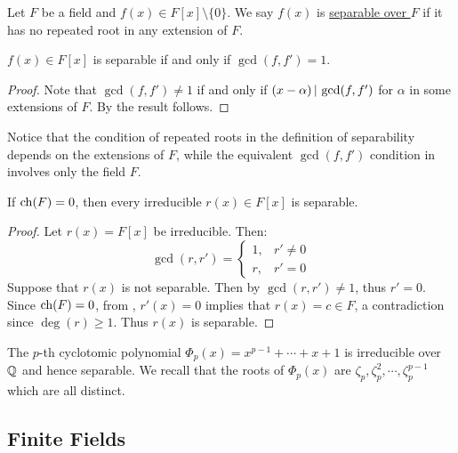 \documentclass[11pt]{article}
\begin{document}
\begin{definition}
    Let $F$ be a field and $f(x)\in F[x]\setminus\{0\}$. We say $f(x)$ is \ul{separable over $F$} if it has no repeated root in any extension of $F$.
\end{definition}

\begin{corollary}
    $f(x)\in F[x]$ is separable if and only if $\gcd(f,f')=1$.
\end{corollary}

\begin{proof}
    Note that $\gcd(f,f')\neq1$ if and only if $(x-\alpha)\,|\, \gcd(f,f')$ for $\alpha$ in some extensions of $F$. By  the result follows.
\end{proof}

\begin{remark}
    Notice that the condition of repeated roots in the definition of separability depends on the extensions of $F$, while the equivalent $\gcd(f,f')$ condition in  involves only the field $F$.
\end{remark}

\begin{corollary}
    If $\operatorname{ch}(F)=0$, then every irreducible $r(x)\in F[x]$ is separable.
\end{corollary}

\begin{proof}
    Let $r(x)=F[x]$ be irreducible. Then:
    \[\gcd(r,r')=\begin{cases}1, & r'\neq0 \\ r, & r'=0\end{cases}\]
    Suppose that $r(x)$ is not separable. Then by  $\gcd(r,r')\neq1$, thus $r'=0$. Since $\operatorname{ch}(F)=0$, from , $r'(x)=0$ implies that $r(x)=c\in F$, a contradiction since $\deg(r)\geq1$. Thus $r(x)$ is separable.
\end{proof}

\begin{example}
    The $p$-th cyclotomic polynomial $\Phi_p(x)=x^{p-1}+\cdots+x+1$ is irreducible over $\mathbb{Q}$ and hence separable. We recall that the roots of $\Phi_p(x)$ are $\zeta_p,\zeta_p^2,\cdots,\zeta_p^{p-1}$ which are all distinct.
\end{example}

\subsection{Finite Fields}
\end{document}
